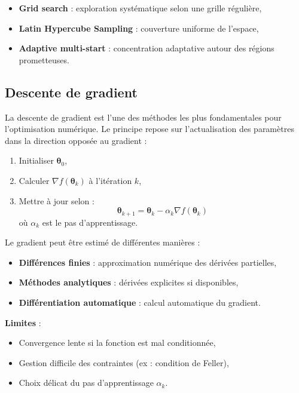 \begin{itemize}
	\item \textbf{Grid search} : exploration systématique selon une grille régulière,
	\item \textbf{Latin Hypercube Sampling} : couverture uniforme de l'espace,
	\item \textbf{Adaptive multi-start} : concentration adaptative autour des régions prometteuses.
\end{itemize}

\subsection{Descente de gradient}

La descente de gradient est l'une des méthodes les plus fondamentales pour l'optimisation numérique. Le principe repose sur l'actualisation des paramètres dans la direction opposée au gradient :

\begin{enumerate}
	\item Initialiser $\boldsymbol{\theta}_0$,
	\item Calculer $\nabla f(\boldsymbol{\theta}_k)$ à l'itération $k$,
	\item Mettre à jour selon :
	\begin{equation}
		\boldsymbol{\theta}_{k+1} = \boldsymbol{\theta}_k - \alpha_k \nabla f(\boldsymbol{\theta}_k)
	\end{equation}
	où $\alpha_k$ est le pas d'apprentissage.
\end{enumerate}

Le gradient peut être estimé de différentes manières :

\begin{itemize}
	\item \textbf{Différences finies} : approximation numérique des dérivées partielles,
	\item \textbf{Méthodes analytiques} : dérivées explicites si disponibles,
	\item \textbf{Différentiation automatique} : calcul automatique du gradient.
\end{itemize}

\textbf{Limites} :
\begin{itemize}
	\item Convergence lente si la fonction est mal conditionnée,
	\item Gestion difficile des contraintes (ex : condition de Feller),
	\item Choix délicat du pas d'apprentissage $\alpha_k$.
\end{itemize}

